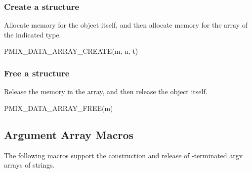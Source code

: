 \begin{arglist}
\end{arglist}


\subsubsection{Create a  structure}

Allocate memory for the  object itself, and then allocate memory for the array of the indicated type.

\cspecificstart
\begin{codepar}
PMIX_DATA_ARRAY_CREATE(m, n, t)
\end{codepar}
\cspecificend

\begin{arglist}
\end{arglist}


\subsubsection{Free a  structure}

Release the memory in the array, and then release the  object itself.

\cspecificstart
\begin{codepar}
PMIX_DATA_ARRAY_FREE(m)
\end{codepar}
\cspecificend

\begin{arglist}
\end{arglist}

\subsection{Argument Array Macros}

The following macros support the construction and release of -terminated argv arrays of strings.


